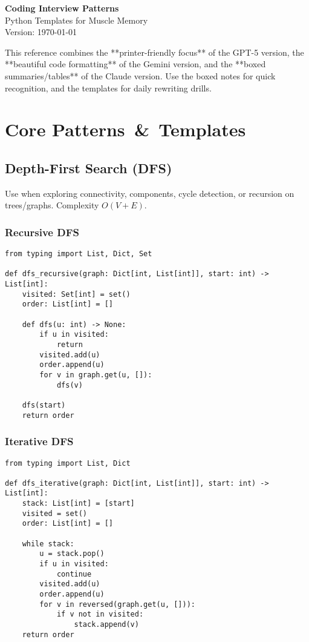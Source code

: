 \documentclass[11pt]{article}
\begin{document}
\begin{center}
  {\LARGE \textbf{Coding Interview Patterns}}\\[0.4em]
  {\large Python Templates for Muscle Memory}\\[0.4em]
  {\normalsize Version: \today}
\end{center}

\vspace{0.5em}
This reference combines the **printer-friendly focus** of the GPT-5 version, the **beautiful code formatting** of the Gemini version, and the **boxed summaries/tables** of the Claude version. Use the boxed notes for quick recognition, and the templates for daily rewriting drills.

\tableofcontents
\newpage

\section{Core Patterns \,\& \,Templates}

\subsection{Depth-First Search (DFS)}
\begin{tcolorbox}[colback=codebg,colframe=black!50,title=When to Use DFS]
  Use when exploring connectivity, components, cycle detection, or recursion on trees/graphs. Complexity $O(V+E)$. 
\end{tcolorbox}

\subsubsection*{Recursive DFS}
\begin{verbatim}
from typing import List, Dict, Set

def dfs_recursive(graph: Dict[int, List[int]], start: int) -> List[int]:
    visited: Set[int] = set()
    order: List[int] = []

    def dfs(u: int) -> None:
        if u in visited:
            return
        visited.add(u)
        order.append(u)
        for v in graph.get(u, []):
            dfs(v)

    dfs(start)
    return order
\end{verbatim}

\subsubsection*{Iterative DFS}
\begin{verbatim}
from typing import List, Dict

def dfs_iterative(graph: Dict[int, List[int]], start: int) -> List[int]:
    stack: List[int] = [start]
    visited = set()
    order: List[int] = []

    while stack:
        u = stack.pop()
        if u in visited:
            continue
        visited.add(u)
        order.append(u)
        for v in reversed(graph.get(u, [])):
            if v not in visited:
                stack.append(v)
    return order
\end{verbatim}
\end{document}
